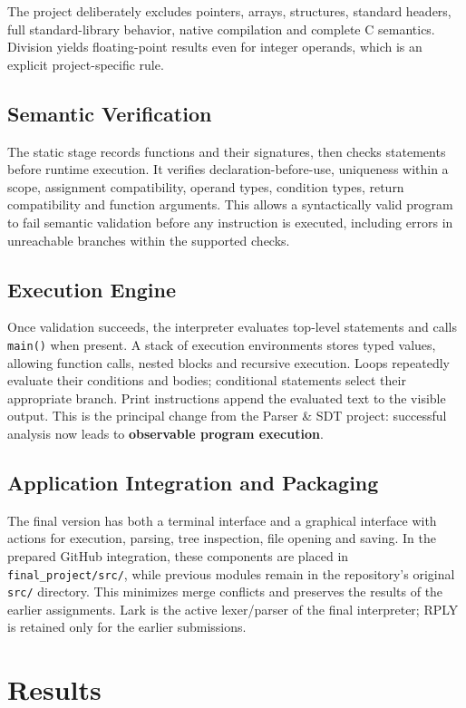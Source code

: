 \documentclass[letterpaper,12pt,oneside]{article}
\begin{document}
The project deliberately excludes pointers, arrays, structures, standard headers, full standard-library behavior, native compilation and complete C semantics. Division yields floating-point results even for integer operands, which is an explicit project-specific rule.

\subsection{Semantic Verification}
The static stage records functions and their signatures, then checks statements before runtime execution. It verifies declaration-before-use, uniqueness within a scope, assignment compatibility, operand types, condition types, return compatibility and function arguments. This allows a syntactically valid program to fail semantic validation before any instruction is executed, including errors in unreachable branches within the supported checks.

\subsection{Execution Engine}
Once validation succeeds, the interpreter evaluates top-level statements and calls \texttt{main()} when present. A stack of execution environments stores typed values, allowing function calls, nested blocks and recursive execution. Loops repeatedly evaluate their conditions and bodies; conditional statements select their appropriate branch. Print instructions append the evaluated text to the visible output. This is the principal change from the Parser \& SDT project: successful analysis now leads to \textbf{observable program execution}.

\subsection{Application Integration and Packaging}
The final version has both a terminal interface and a graphical interface with actions for execution, parsing, tree inspection, file opening and saving. In the prepared GitHub integration, these components are placed in \texttt{final\_project/src/}, while previous modules remain in the repository's original \texttt{src/} directory. This minimizes merge conflicts and preserves the results of the earlier assignments. Lark is the active lexer/parser of the final interpreter; RPLY is retained only for the earlier submissions.

\section{Results}
\end{document}
